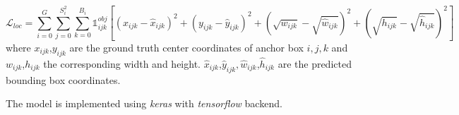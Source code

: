 \begin{equation}
\mathcal{L}_{loc} = \sum_{i=0}^{G} \sum_{j=0}^{S_i^2}\sum_{k=0}^{B_i} \mathbb{1}_{ijk}^{obj}[(x_{ijk}-\hat{x}_{ijk})^2 + (y_{ijk}-\hat{y}_{ijk})^2  + (\sqrt{w_{ijk}}-\sqrt{\hat{w}_{ijk}})^2 +(\sqrt{h_{ijk}}-\sqrt{\hat{h}_{ijk}})^2 ]
\end{equation}
where $x_{ijk}$,$y_{ijk}$ are the ground truth center coordinates of anchor box $i,j,k$ and $w_{ijk}$,$h_{ijk}$ the corresponding width and height. $\hat x_{ijk}$,$\hat y_{ijk}, \hat w_{ijk}$,$\hat h_{ijk}$ are the predicted bounding box coordinates. 

The model is implemented using \textit{keras} with \textit{tensorflow} backend. 